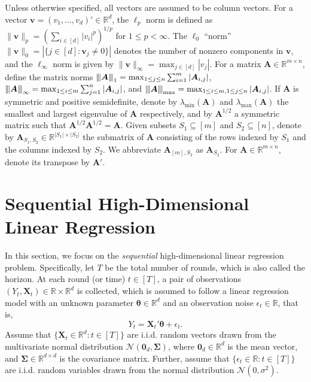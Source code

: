 \documentclass[aos,preprint]{imsart}
\theoremstyle{plain}
\theoremstyle{definition}
\newcommand{\btheta}{\boldsymbol{\theta}}
\newcommand{\bX}{\boldsymbol{X}}
\newcommand{\bSigma}{\boldsymbol{\Sigma}}
\newcommand{\op}[1]{{\left\vert\kern-0.25ex\left\vert\kern-0.25ex\left\vert #1\right\vert\kern-0.25ex\right\vert\kern-0.25ex\right\vert}}
\newcommand{\lmin}[1]{\lambda_{\min}\left(#1\right)}
\newcommand{\lmax}[1]{\lambda_{\max}\left(#1\right)}
\newcommand{\mR}{\mathbb{R}}
\newcommand{\bA}{\boldsymbol{A}}
\newcommand{\bv}{\boldsymbol{v}}
\newcommand{\bR}{\mathbb{R}}
\begin{document}
Unless otherwise specified, all vectors are assumed to be column vectors. For a vector $\bv = (v_1, \ldots, v_d)' \in \mathbb{R}^d$, the $\ell_p$ norm is defined as $\|\bv\|_p = ( \sum_{i \in [d]} |v_i|^p )^{1/p}$ for $1 \le p < \infty$. The $\ell_0$ “norm” $\|\bv\|_{0} =|\{j \in [d]:  \bv_j \neq 0\}|$ denotes the number of nonzero components in $\bv$, and the $\ell_\infty$ norm is given by $\|\bv\|_\infty = \max_{j \in [d]} |v_j|$. 
For a matrix $\bA\in \mR^{m\times n}$,  define the matrix norms $\op{\bA}_1 = \max_{1\le j\le n}\sum_{i=1}^m |\bA_{i,j}|$, $\op{\bA}_{\infty} = \max_{1\le i\le m}\sum_{j=1}^n |\bA_{i,j}|$, and $\op{\bA}_{\textup{max}} = \max_{1\leq i \leq m, 1\leq j \leq n}|\bA_{i,j}|$. If $\bA$ is symmetric  and positive semidefinite,  denote by $\lmin{\bA}$ and $\lmax{\bA}$ the smallest and largest eigenvalue of $\bA$ respectively, and
by $\bA^{1/2}$ a symmetric matrix such that $\bA^{1/2} \bA^{1/2} = \bA$. Given subsets $S_1 \subseteq [m]$ and $S_2 \subseteq [n]$, denote by $\bA_{S_1, S_2} \in \bR^{|S_1| \times |S_2|}$ the submatrix of $\bA$ consisting of the rows indexed by $S_1$ and the columns indexed by $S_2$. We abbreviate $\bA_{[m],S_2}$ as $\bA_{S_2}$. For $\bA\in \mR^{m\times n}$,  denote its transpose by $\bA'$.





\section{Sequential High-Dimensional Linear Regression} \label{sec: multi linear}
In this section, we focus on the \textit{sequential} high-dimensional linear regression problem. Specifically, let $T$ be the total number of rounds, which is also called the horizon. At each round (or time) $t\in [T]$, a pair of observations $(Y_t, \bX_t)\in\mR\times\mR^d$ is collected, which is assumed to follow a linear regression model with an unknown parameter $\btheta\in\mR^d$ and an observation noise  $\epsilon_t\in\mR$, that is,
\begin{equation*}%
Y_t=\bX_t'\btheta + \epsilon_t.
\end{equation*}
Assume that $\{\bX_t \in \mathbb{R}^d : t \in [T]\}$ are i.i.d. random vectors drawn from the multivariate normal distribution $\mathcal{N}(\mathbf{0}_d, \bSigma)$, where $\mathbf{0}_d \in \mathbb{R}^{d}$ is the mean vector, and $\bSigma \in \mathbb{R}^{d \times d}$ is the covariance matrix.
Further, assume that $\{\epsilon_t \in \mathbb{R} : t \in [T]\}$ are i.i.d. random variables drawn from the normal distribution $\mathcal{N}(0, \sigma^2)$.
\end{document}
